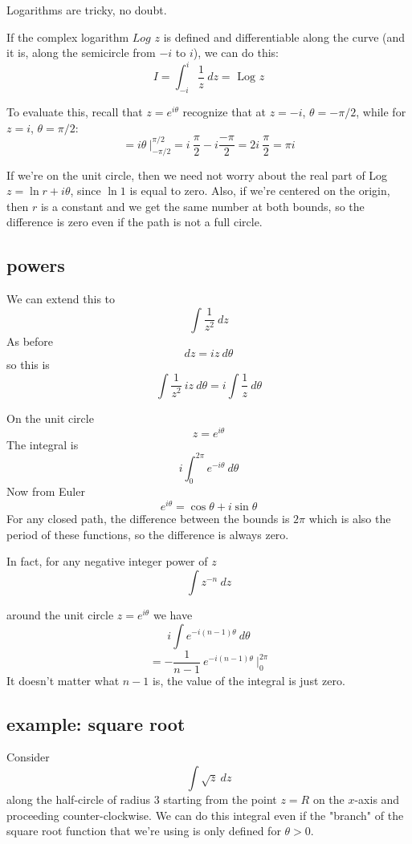 \documentclass[11pt, oneside]{article}
\begin{document}
Logarithms are tricky, no doubt.  

If the complex logarithm $Log$ $z$ is defined and differentiable along the curve (and it is, along the semicircle from $-i$ to $i$), we can do this:
\[ I = \int_{-i}^i \frac{1}{z} \ dz = \text{ Log } z  \]

To evaluate this, recall that $z = e^{i\theta}$ recognize that at $z = -i$, $\theta = - \pi/2$, while for $z = i$, $\theta = \pi/2$:
\[ = i \theta \ \bigg |_{-\pi/2}^{\pi/2} =  i \ \frac{\pi}{2}  -  i \frac{-\pi}{2}  = 2i \ \frac{\pi}{2} = \pi i \]

If we're on the unit circle, then we need not worry about the real part of Log $z = \ln r + i \theta$, since $\ln 1$ is equal to zero.  Also, if we're centered on the origin, then $r$ is a constant and we get the same number at both bounds, so the difference is zero even if the path is not a full circle.

\subsection*{powers}
We can extend this to 
\[ \int \frac{1}{z^2} \ dz \]
As before
\[ dz = i z \ d \theta \]
so this is
\[ \int \frac{1}{z^2} \ i z \ d \theta = i \int \frac{1}{z} \ d \theta \]

On the unit circle
\[ z = e^{i\theta} \]
The integral is
\[  i \int_0^{2 \pi} e^{-i\theta} \ d \theta \]
Now from Euler
\[ e^{i \theta} = \cos \theta + i \sin \theta \]
For any closed path, the difference between the bounds is $2\pi$ which is also the period of these functions, so the difference is always zero.

In fact, for any negative integer power of $z$
\[ \int z^{-n} \ dz \]

around the unit circle $z=e^{i\theta}$ we have
\[ i \int e^{-i(n-1)\theta} \ d \theta \]
\[ = -\frac{1}{n-1} \ e^{-i(n-1)\theta} \ \bigg |_0^{2 \pi}  \]
It doesn't matter what $n-1$ is, the value of the integral is just zero.

\subsection*{example: square root}
Consider
\[ \int \sqrt{z} \ dz \]
along the half-circle of radius $3$ starting from the point $z = R$ on the $x$-axis and proceeding counter-clockwise.
We can do this integral even if the "branch" of the square root function that we're using is only defined for $\theta > 0$.  
\end{document}

